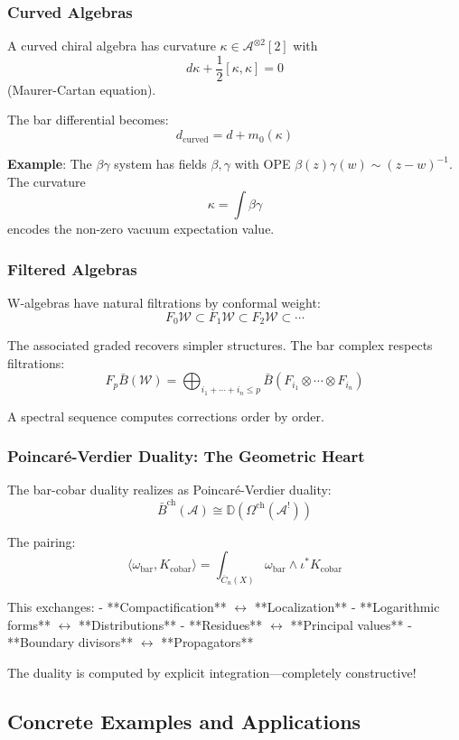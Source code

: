\subsubsection{Curved Algebras}

A curved chiral algebra has curvature $\kappa \in \mathcal{A}^{\otimes 2}[2]$ with
$$d\kappa + \frac{1}{2}[\kappa, \kappa] = 0$$
(Maurer-Cartan equation).

The bar differential becomes:
$$d_{\text{curved}} = d + m_0(\kappa)$$

\textbf{Example}: The $\beta\gamma$ system has fields $\beta, \gamma$ with OPE $\beta(z)\gamma(w) \sim (z-w)^{-1}$. The curvature
$$\kappa = \int \beta\gamma$$
encodes the non-zero vacuum expectation value.

\subsubsection{Filtered Algebras}  

W-algebras have natural filtrations by conformal weight:
$$F_0 \mathcal{W} \subset F_1 \mathcal{W} \subset F_2 \mathcal{W} \subset \cdots$$

The associated graded recovers simpler structures. The bar complex respects filtrations:
$$F_p\bar{B}(\mathcal{W}) = \bigoplus_{i_1 + \cdots + i_n \leq p} \bar{B}(F_{i_1} \otimes \cdots \otimes F_{i_n})$$

A spectral sequence computes corrections order by order.

\subsubsection{Poincaré-Verdier Duality: The Geometric Heart}

The bar-cobar duality realizes as Poincaré-Verdier duality:
$$\bar{B}^{\text{ch}}(\mathcal{A}) \cong \mathbb{D}(\Omega^{\text{ch}}(\mathcal{A}^!))$$

The pairing:
$$\langle \omega_{\text{bar}}, K_{\text{cobar}} \rangle = \int_{\overline{C}_n(X)} \omega_{\text{bar}} \wedge \iota^* K_{\text{cobar}}$$

This exchanges:
- **Compactification** $\leftrightarrow$ **Localization**  
- **Logarithmic forms** $\leftrightarrow$ **Distributions**
- **Residues** $\leftrightarrow$ **Principal values**
- **Boundary divisors** $\leftrightarrow$ **Propagators**

The duality is computed by explicit integration—completely constructive!

\subsection{Concrete Examples and Applications}

